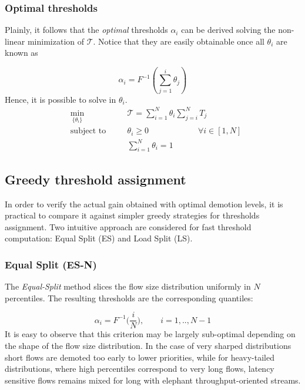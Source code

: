 \subsubsection{Optimal thresholds}
\label{sec:pias-queueing-model}
Plainly, it follows that the \textit{optimal} thresholds $\alpha_i$ can be derived solving the non-linear minimization of $\mathcal{T}$. Notice that they are easily obtainable once all $\theta_i$ are known as 

\[
\alpha_i = F^{-1}(\sum_{j=1}^{i}\theta_j)
\]
Hence, it is possible to solve in $\theta_i$.
\begin{equation}
\label{eq::costfunction}
\begin{aligned}
&\underset{\{\theta_i\}}{\text{min}} \quad  & &\mathcal{T} = 
\sum_{i=1}^{N} \theta_i \sum_{j=i}^{N}T_j \\
&\text{subject to} \quad  & &\theta_i \ge 0 \qquad \qquad \qquad \forall i \in [1,N]  \\
& & & \sum_{i=1}^{N} \theta_i = 1 
\end{aligned}
\end{equation}

\subsection{Greedy threshold assignment}
\label{sec:greedy-thresh}
In order to verify the actual gain obtained with optimal demotion levels, it is practical to compare it against simpler greedy strategies for thresholds assignment. Two intuitive approach are considered for fast threshold computation: Equal Split (ES) and Load Split (LS). 

\subsubsection{Equal Split (ES-N)}
The \textit{Equal-Split} method slices the flow size distribution uniformly in $N$ percentiles. The resulting thresholds are the corresponding quantiles:

\[
\alpha_{i} = F^{-1}\Big(\dfrac{i}{N}\Big), \qquad i=1,..,N-1
\]
It is easy to observe that this criterion may be largely sub-optimal depending on the shape of the flow size distribution. In the case of very sharped distributions short flows are demoted too early to lower priorities, while for heavy-tailed distributions, where high percentiles correspond to very long flows, latency sensitive flows remains mixed for long with elephant throughput-oriented streams.

